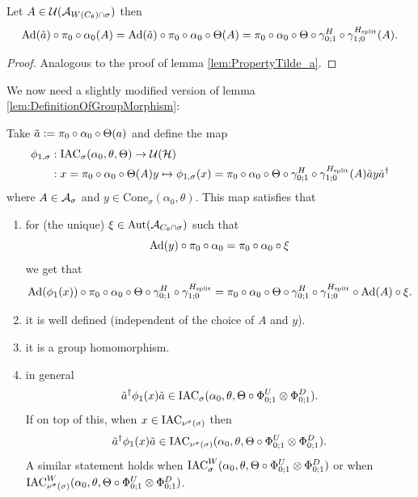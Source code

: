 \documentclass[12pt,a4paper,twoside]{article}
\numberwithin{equation}{section}
\begin{document}
\begin{lemma}\label{lem:PropertyTilde_aTwoTranslations}
	Let $A\in\UU(\AA_{W(C_\theta)\cap\sigma})$ then
	\begin{equation}
	\Ad{\tilde{a}}\circ\pi_0\circ\alpha_0(A)=\Ad{\tilde{a}}\circ\pi_0\circ\alpha_0\circ\Theta(A)=\pi_0\circ\alpha_0\circ\Theta\circ\gamma^H_{0;1}\circ\gamma^{H_{\text{split}}}_{1;0}(A).
	\end{equation}
\end{lemma}
\begin{proof}
	Analogous to the proof of lemma \ref{lem:PropertyTilde_a}.
\end{proof}
We now need a slightly modified version of lemma \ref{lem:DefinitionOfGroupMorphism}:
\begin{lemma}\label{lem:DefinitionOfGroupMorphismTwoTranslations}
	Take $\tilde{a}\defeq \pi_0\circ\alpha_0\circ\Theta(a)$ and define the map
	\begin{align}
		\phi_{1,\sigma}&:\IAC_{\sigma}(\alpha_0,\theta,\Theta) \rightarrow \UU(\HH)\\
		\nonumber
		&:x=\pi_0\circ\alpha_0\circ\Theta(A)y\mapsto \phi_{1,\sigma}(x)=\pi_0\circ\alpha_0\circ\Theta\circ\gamma^H_{0;1}\circ\gamma^{H_{\text{split}}}_{1;0}(A)\tilde{a}y\tilde{a}^\dagger
	\end{align}
	where $A\in\AA_{\sigma}$ and $y\in\textrm{Cone}_{\sigma}(\alpha_0,\theta)$. This map satisfies that
	\begin{enumerate}
		\item  for (the unique) $\xi\in\Aut{\AA_{C_\theta\cap \sigma}}$ such that
		\begin{equation}
			\Ad{y}\circ\pi_0\circ\alpha_0=\pi_0\circ\alpha_0\circ\xi
		\end{equation}
		we get that
		\begin{equation}\label{eq:ConditionDefinitionOfGroupMorphismTwoTranslations}
			\Ad{\phi_1(x)}\circ\pi_0\circ\alpha_0\circ\Theta\circ\gamma^H_{0;1}\circ\gamma^{H_{\text{split}}}_{1;0}=\pi_0\circ\alpha_0\circ\Theta\circ\gamma^H_{0;1}\circ\gamma^{H_{\text{split}}}_{1;0}\circ\Ad{A}\circ\xi.
		\end{equation}
		\item it is well defined (independent of the choice of $A$ and $y$).
		\item it is a group homomorphism.
		\item in general
			\begin{equation}
				\tilde{a}^\dagger\phi_1(x)\tilde{a}\in\IAC_\sigma(\alpha_0,\theta,\Theta\circ \Phi^U_{0;1}\otimes\Phi^D_{0;1}).
			\end{equation}
			If on top of this, when $x\in\IAC_{\nu^\sigma(\sigma)}$ then
			\begin{equation}
				\tilde{a}^\dagger\phi_1(x)\tilde{a}\in\IAC_{\nu^\sigma(\sigma)}(\alpha_0,\theta,\Theta\circ \Phi^U_{0;1}\otimes\Phi^D_{0;1}).
			\end{equation}
			A similar statement holds when $\IAC_{\sigma}^W(\alpha_0,\theta,\Theta\circ \Phi^U_{0;1}\otimes\Phi^D_{0;1})$ or when $\IAC_{\nu^\sigma(\sigma)}^W(\alpha_0,\theta,\Theta\circ \Phi^U_{0;1}\otimes\Phi^D_{0;1})$.
	\end{enumerate}
\end{lemma}
\end{document}

